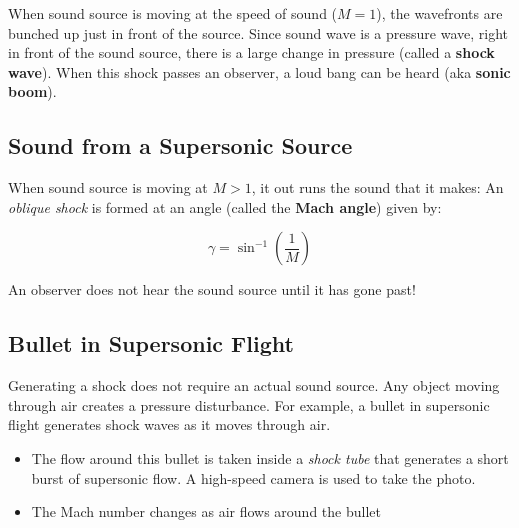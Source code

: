 When sound source is moving at the speed of sound ($M=1$), the wavefronts are
bunched up just in front of the source. Since sound wave is a pressure wave,
right in front of the sound source, there is a large change in pressure (called
a \textbf{shock  wave}). When this shock passes an observer, a loud bang can be
heard (aka \textbf{sonic boom}).




\subsection{Sound from a Supersonic Source}

\begin{figure}[ht]
  \centering
\end{figure}
When sound source is moving at $M>1$, it out runs the sound that it makes: An
\emph{oblique shock} is formed at an angle (called the \textbf{Mach angle})
given by:
    
\begin{equation}
  \gamma=\sin^{-1}\left(\frac 1M\right)
\end{equation}

An observer does not hear the sound source until it has gone past!
%  
%
%
%
%
\subsection{Bullet in Supersonic Flight}
Generating a shock does not require an actual sound source. Any object moving
through air creates a pressure disturbance. For example, a bullet in supersonic
flight generates shock waves as it moves through air.
\begin{itemize}
\item The flow around this bullet is taken inside a \emph{shock tube} that
  generates a short burst of supersonic flow. A high-speed camera is used to
  take the photo.
\item The Mach number changes as air flows around the bullet
\end{itemize}

